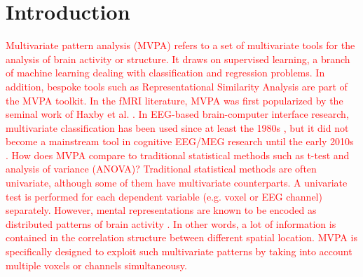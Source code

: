 \documentclass[utf8]{frontiersSCNS} %
\newcommand{\red}[1]{\textcolor{red}{#1}}
\begin{document}
\section{Introduction}

\red{Multivariate pattern analysis (MVPA) refers to a set of multivariate tools for the analysis of brain activity or structure. It draws on supervised learning, a branch of machine learning dealing with classification and regression problems. In addition, bespoke tools such as Representational Similarity Analysis \citep{Kriegeskorte2008} are part of the MVPA toolkit. In the fMRI literature, MVPA was first popularized by the seminal work of Haxby et al. \citep{Haxby2001,Haxby2012,Norman2006}. In EEG-based brain-computer interface research, multivariate classification has been used since at least the 1980s \citep{Farwell}, but it did not become a mainstream tool in cognitive EEG/MEG research until the early 2010s \citep{Blankertz2011,Lemm2011,Mur2009,Pereira2009}. How does MVPA compare to traditional statistical methods such as t-test and analysis of variance (ANOVA)? Traditional statistical methods are often univariate, although some of them have multivariate counterparts. A univariate test is performed for each dependent variable (e.g. voxel or EEG channel) separately. However, mental representations are known to be encoded as distributed patterns of brain activity \citep{Haxby2001}. In other words, a lot of information is contained in the correlation structure between different spatial location. MVPA is specifically designed to exploit such multivariate patterns by taking into account multiple voxels or channels simultaneousy.}
\end{document}
